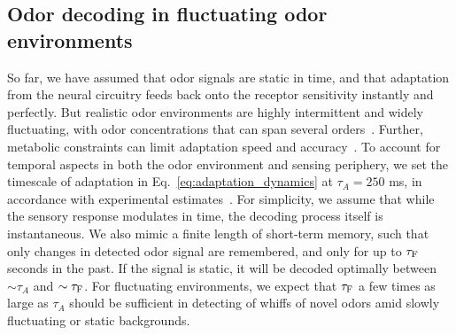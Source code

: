\subsection{Odor decoding in fluctuating odor environments}
So far, we have assumed that odor signals are static in time, and that adaptation from the neural circuitry feeds back onto the receptor sensitivity instantly and perfectly. But realistic odor environments are highly intermittent and widely fluctuating, with odor concentrations that can span several orders~\cite{celani}. Further, metabolic constraints can limit adaptation speed and accuracy~\cite{ESA}. To account for temporal aspects in both the odor environment and sensing periphery, we set the timescale of adaptation in Eq.~\ref{eq:adaptation_dynamics} at $\tau_A = 250$ ms, in accordance with experimental estimates~\cite{srinivas_elife}. For simplicity, we assume that while the sensory response modulates in time, the decoding process itself is instantaneous. We also mimic a finite length of short-term memory, such that only changes in detected odor signal are remembered, and  only for up to $\tau_{\textup {F}}$ seconds in the past. If the signal is static, it will be decoded optimally between $\sim\tau_A$ and $\sim\tau_{\textup{F}}$. For fluctuating environments, we expect that $\tau_{\textup{F}}$ a few times as large as $\tau_A$ should be sufficient in detecting of whiffs of novel odors amid slowly fluctuating or static backgrounds.




